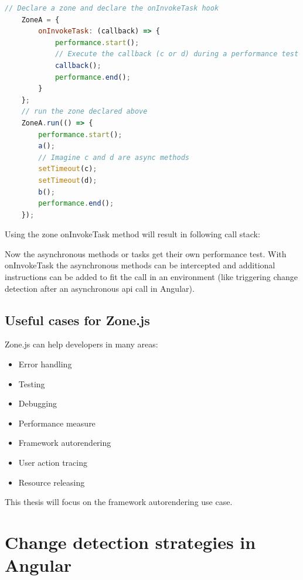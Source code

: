 \begin{lstlisting}[language=Javascript]
	// Declare a zone and declare the onInvokeTask hook
	ZoneA = {
		onInvokeTask: (callback) => {
			performance.start();
			// Execute the callback (c or d) during a performance test
			callback();
			performance.end();
		}	
	};
	// run the zone declared above
	ZoneA.run(() => {
		performance.start();
		a();
		// Imagine c and d are async methods
		setTimeout(c);
		setTimeout(d);
		b();
		performance.end();
	});
\end{lstlisting}

Using the zone onInvokeTask method will result in following call stack:


Now the asynchronous methods or tasks get their own performance test.
With onInvokeTask the asynchronous methods can be intercepted and additional instructions can be added to fit the call in an environment (like triggering change detection after an asynchronous api call in Angular).

\subsection{Useful cases for Zone.js}
Zone.js can help developers in many areas: 
\begin{itemize}
	\item Error handling
	\item Testing
	\item Debugging
	\item Performance measure
	\item Framework autorendering
	\item User action tracing
	\item Resource releasing
\end{itemize}

This thesis will focus on the framework autorendering use case.



\section{Change detection strategies in Angular}
